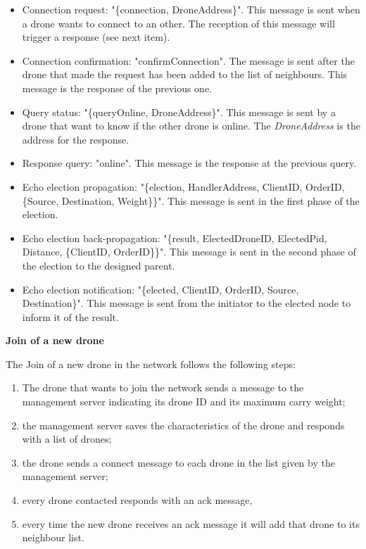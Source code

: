 \documentclass[a4paper, oneside]{memoir}
\begin{document}
\begin{itemize}
	\item Connection request: "\{connection, DroneAddress\}".
	This message is sent when a drone wants to connect to an other. The reception of this message will trigger a response (see next item).

	\item Connection confirmation: "confirmConnection".
	The message is sent after the drone that made the request has been added to the list of neighbours. This message is the response of the previous one.

	\item Query status: "\{queryOnline, DroneAddress\}".
	This message is sent by a drone that want to know if the other drone is online. The \textit{DroneAddress} is the address for the response.

	\item Response query: "online".
	This message is the response at the previous query.

	\item Echo election propagation: "\{election, HandlerAddress, ClientID, OrderID, \{Source, Destination, Weight\}\}".
	This message is sent in the first phase of the election.

	\item Echo election back-propagation: "\{result, ElectedDroneID, ElectedPid, Distance, \{ClientID, OrderID\}\}".
	This message is sent in the second phase of the election to the designed parent.

	\item Echo election notification: "\{elected, ClientID, OrderID, Source, Destination\}".
	This message is sent from the initiator to the elected node to inform it of the result.
\end{itemize}
\newpage


\textbf{Join of a new drone}

The Join of a new drone in the network follows the following steps:
\begin{enumerate}
\item The drone that wants to join the network sends a message to the management server indicating its drone ID and its maximum carry weight;
\item the management server saves the characteristics of the drone and responds with a list of drones;
\item the drone sends a connect message to each drone in the list given by the management server;
\item every drone contacted responds with an ack message,
\item every time the new drone receives an ack message it will add that drone to its neighbour list.
\end{enumerate}
\end{document}
